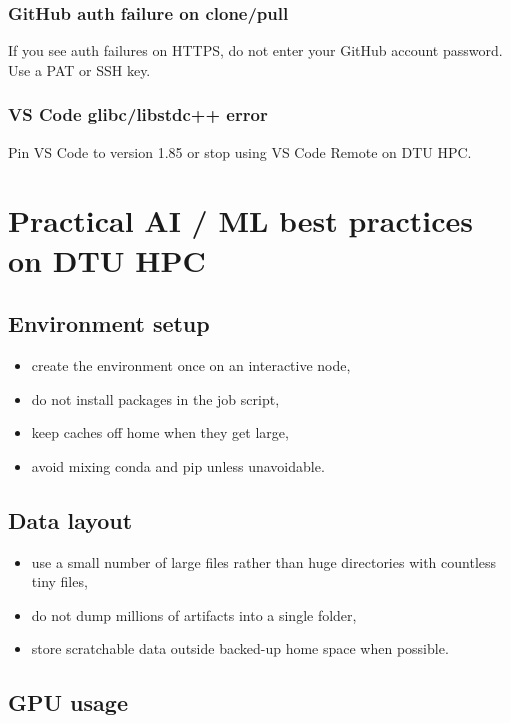 \documentclass[11pt,a4paper]{article}
\begin{document}
\subsubsection{GitHub auth failure on clone/pull}

If you see auth failures on HTTPS, do not enter your GitHub account password. Use a PAT or SSH key.

\subsubsection{VS Code glibc/libstdc++ error}

Pin VS Code to version 1.85 or stop using VS Code Remote on DTU HPC.

\section{Practical AI / ML best practices on DTU HPC}

\subsection{Environment setup}

\begin{itemize}[leftmargin=1.5em]
  \item create the environment once on an interactive node,
  \item do not install packages in the job script,
  \item keep caches off home when they get large,
  \item avoid mixing conda and pip unless unavoidable.
\end{itemize}

\subsection{Data layout}

\begin{itemize}[leftmargin=1.5em]
  \item use a small number of large files rather than huge directories with countless tiny files,
  \item do not dump millions of artifacts into a single folder,
  \item store scratchable data outside backed-up home space when possible.
\end{itemize}

\subsection{GPU usage}
\end{document}
